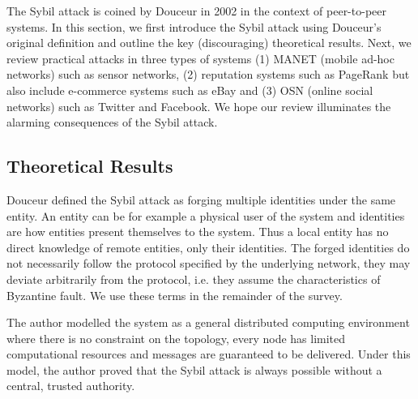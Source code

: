 The Sybil attack is coined by Douceur\cite{douceur2002sybil} in 2002 in the
context of peer-to-peer systems. In this section, we first introduce the Sybil
attack using Douceur's original definition and outline the key (discouraging)
theoretical results. Next, we review practical attacks in three types of systems
(1) MANET (mobile ad-hoc networks) such as sensor networks, (2) reputation
systems such as PageRank\cite{page1999pagerank} but also include e-commerce
systems such as eBay and (3) OSN (online social networks) such as Twitter and
Facebook. We hope our review illuminates the alarming consequences of the Sybil
attack.

\subsection{Theoretical Results}\label{sec:sybil-theory}
Douceur defined the Sybil attack as forging multiple identities under the same
entity\cite{douceur2002sybil}. An entity can be for example a physical user of
the system and identities are how entities present themselves to the system.
Thus a local entity has no direct knowledge of remote entities, only their
identities. The forged identities do not necessarily follow the protocol
specified by the underlying network, they may deviate arbitrarily from the
protocol, i.e. they assume the characteristics of Byzantine
fault\cite{lamport1982byzantine}. We use these terms in the remainder of the
survey.

The author modelled the system as a general distributed computing
environment where there is no constraint on the topology, every node has limited
computational resources and messages are guaranteed to be delivered. Under this
model, the author proved that the Sybil attack is always possible without a
central, trusted authority.


